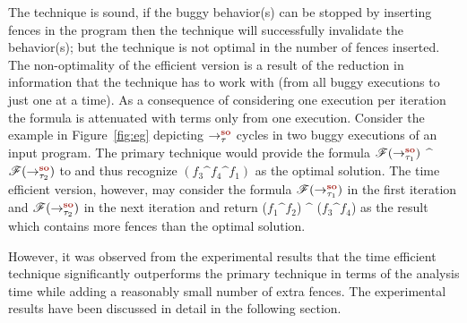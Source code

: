 The technique is sound, \ie if the buggy behavior(s) can be stopped by 
inserting \sc fences in the program then the technique will successfully
invalidate the behavior(s);
but the technique is not optimal in the number of fences inserted.
The non-optimality of the efficient version is a result of the reduction
in information that the technique has to work with (from all buggy executions
to just one at a time). As a consequence of considering one execution per
iteration the \z formula is attenuated with terms only from one execution.
%
Consider the example in Figure~\ref{fig:eg} depicting $\setSO$ cycles in 
two buggy executions of an input program. The primary \ourtechnique 
technique would provide the formula $\formula{\so{\tau_1}{}{}}$ $\^$ 
$\formula{\so{\tau_2}{}{}}$ to \z and thus recognize $(f_3 \^ f_4 \^ f_1)$ 
as the optimal solution.
The time efficient version, however, may consider the formula 
$\formula{\so{\tau_1}{}{}}$ in the first iteration and 
$\formula{\so{\tau_2}{}{}}$ in the next iteration and return  ($f_1 \^ f_2$) 
$\^$ ($f_3 \^ f_4$) as the result which contains more fences than the 
optimal solution.

However, it was observed from the experimental results that the time
efficient technique significantly outperforms the primary technique in terms of 
the analysis time while adding a reasonably small number of extra \sc
fences. The experimental results have been discussed in detail in the 
following section.